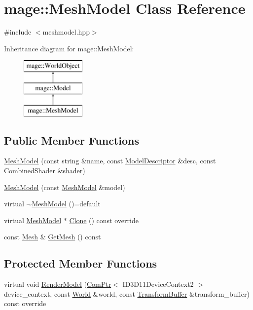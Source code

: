 \hypertarget{classmage_1_1_mesh_model}{}\section{mage\+:\+:Mesh\+Model Class Reference}
\label{classmage_1_1_mesh_model}


{\ttfamily \#include $<$meshmodel.\+hpp$>$}

Inheritance diagram for mage\+:\+:Mesh\+Model\+:\begin{figure}[H]
\begin{center}
\leavevmode
\includegraphics[height=3.000000cm]{classmage_1_1_mesh_model}
\end{center}
\end{figure}
\subsection*{Public Member Functions}
\begin{DoxyCompactItemize}
\item 
\hyperlink{classmage_1_1_mesh_model_a95d70993b56b1a649797880583daf3db}{Mesh\+Model} (const string \&name, const \hyperlink{classmage_1_1_model_descriptor}{Model\+Descriptor} \&desc, const \hyperlink{structmage_1_1_combined_shader}{Combined\+Shader} \&shader)
\item 
\hyperlink{classmage_1_1_mesh_model_a74d2443e5d4b0f66ef981ad1312e4987}{Mesh\+Model} (const \hyperlink{classmage_1_1_mesh_model}{Mesh\+Model} \&model)
\item 
virtual \hyperlink{classmage_1_1_mesh_model_a5e918737b966842a31381ef6c00ca6d2}{$\sim$\+Mesh\+Model} ()=default
\item 
virtual \hyperlink{classmage_1_1_mesh_model}{Mesh\+Model} $\ast$ \hyperlink{classmage_1_1_mesh_model_a7130eca9a1dac038c33b838c15138161}{Clone} () const override
\item 
const \hyperlink{classmage_1_1_mesh}{Mesh} \& \hyperlink{classmage_1_1_mesh_model_ab9a1c64ebb6b72cd6862e701983351c4}{Get\+Mesh} () const
\end{DoxyCompactItemize}
\subsection*{Protected Member Functions}
\begin{DoxyCompactItemize}
\item 
virtual void \hyperlink{classmage_1_1_mesh_model_a92e9f0089386608f1912d459745d470f}{Render\+Model} (\hyperlink{namespacemage_ae74f374780900893caa5555d1031fd79}{Com\+Ptr}$<$ I\+D3\+D11\+Device\+Context2 $>$ device\+\_\+context, const \hyperlink{classmage_1_1_world}{World} \&world, const \hyperlink{structmage_1_1_transform_buffer}{Transform\+Buffer} \&transform\+\_\+buffer) const override
\end{DoxyCompactItemize}
